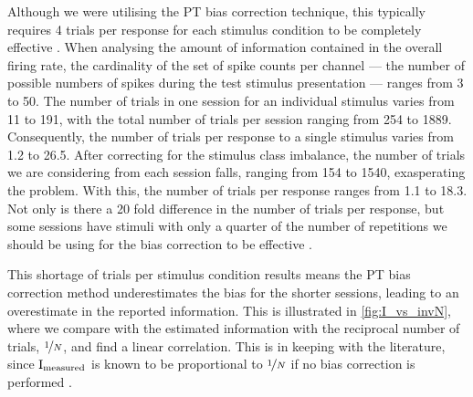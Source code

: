 
Although we were utilising the \ac{PT} bias correction technique, this typically requires \num{4} trials per response for each stimulus condition to be completely effective \citep{Panzeri2007}.
When analysing the amount of information contained in the overall firing rate, the cardinality of the set of spike counts per channel --- the number of possible numbers of spikes during the test stimulus presentation --- ranges from \num{3} to \num{50}.
The number of trials in one session for an individual stimulus varies from \num{11} to \num{191}, with the total number of trials per session ranging from \num{254} to \num{1889}.
Consequently, the number of trials per response to a single stimulus varies from \num{1.2} to \num{26.5}.
After correcting for the stimulus class imbalance, the number of trials we are considering from each session falls, ranging from \num{154} to \num{1540}, exasperating the problem.
With this, the number of trials per response ranges from \num{1.1} to \num{18.3}.
Not only is there a \num{20} fold difference in the number of trials per response, but some sessions have stimuli with only a quarter of the number of repetitions we should be using for the bias correction to be effective \citep{Panzeri2007}.

This shortage of trials per stimulus condition results means the \ac{PT} bias correction method underestimates the bias for the shorter sessions, leading to an overestimate in the reported information.
This is illustrated in \autoref{fig:I_vs_invN}, where we compare with the estimated information with the reciprocal number of trials, $\nicefrac{1}{N}$, and find a linear correlation.
This is in keeping with the literature, since $\operatorname{I}_{\text{measured}}$ is known to be proportional to $\nicefrac{1}{N}$ if no bias correction is performed \citep{Treves1995}.

